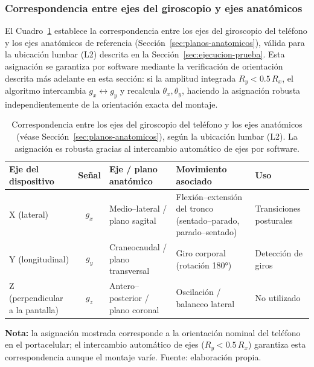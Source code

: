 \documentclass[12pt]{report}
\begin{document}
\begin{justify}
    \subsubsection*{Correspondencia entre ejes del giroscopio y ejes anatómicos}

    El Cuadro~\ref{tab:ejes-giroscopio-anatomicos} establece la correspondencia entre los ejes del giroscopio del teléfono y los ejes anatómicos de referencia (Sección~\ref{sec:planos-anatomicos}), válida para la ubicación lumbar (L2) descrita en la Sección~\ref{sec:ejecucion-prueba}. Esta asignación se garantiza por software mediante la verificación de orientación descrita más adelante en esta sección: si la amplitud integrada $R_y < 0.5\,R_x$, el algoritmo intercambia $g_x \leftrightarrow g_y$ y recalcula $\theta_x, \theta_y$, haciendo la asignación robusta independientemente de la orientación exacta del montaje.

    \begin{table}[H]
        \centering
        \caption{Correspondencia entre los ejes del giroscopio del teléfono y los ejes anatómicos (véase Sección~\ref{sec:planos-anatomicos}), según la ubicación lumbar (L2). La asignación es robusta gracias al intercambio automático de ejes por software.}
        \label{tab:ejes-giroscopio-anatomicos}
        \small
        \renewcommand{\arraystretch}{1.3}
        \begin{tabularx}{\textwidth}{|>{\raggedright\arraybackslash}p{1.9cm}|c|>{\raggedright\arraybackslash}X|>{\raggedright\arraybackslash}X|>{\raggedright\arraybackslash}X|}
            \hline
            \textbf{Eje del dispositivo}    & \textbf{Señal} & \textbf{Eje / plano anatómico}    & \textbf{Movimiento asociado}                                     & \textbf{Uso}            \\
            \hline
            X (lateral)                     & $g_x$          & Medio--lateral / plano sagital    & Flexión--extensión del tronco (sentado--parado, parado--sentado) & Transiciones posturales \\
            \hline
            Y (longitudinal)                & $g_y$          & Craneocaudal / plano transversal  & Giro corporal (rotación 180°)                                    & Detección de giros      \\
            \hline
            Z (perpendicular a la pantalla) & $g_z$          & Antero--posterior / plano coronal & Oscilación / balanceo lateral                                    & No utilizado            \\
            \hline
        \end{tabularx}
        \par\smallskip
        {\footnotesize \textbf{Nota:} la asignación mostrada corresponde a la orientación nominal del teléfono en el portacelular; el intercambio automático de ejes ($R_y<0.5\,R_x$) garantiza esta correspondencia aunque el montaje varíe. Fuente: elaboración propia.}
    \end{table}


\end{justify}
\end{document}
